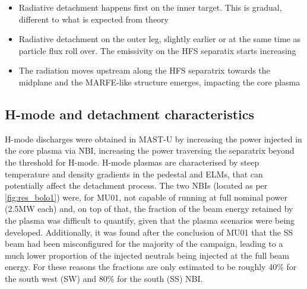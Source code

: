 \begin{itemize}
    \item Radiative detachment happens first on the inner target. This is gradual, different to what is expected from theory\cite{Lipschultz2016}
    \item Radiative detachment on the outer leg, slightly earlier or at the same time as particle flux roll over. The emissivity on the HFS separatix starts increasing
    \item The radiation moves upstream along the HFS separatrix towards the midplane and the MARFE-like structure emerges, impacting the core plasma
\end{itemize}

\subsection{H-mode and detachment characteristics}

H-mode discharges were obtained in MAST-U by increasing the power injected in the core plasma via NBI, increasing the power traversing the separatrix beyond the threshold for H-mode. H-mode plasmas are characterised by steep temperature and density gradients in the pedestal and ELMs, that can potentially affect the detachment process.
The two NBIs (located as per \autoref{fig:res_bolo1}) were, for MU01, not capable of running at full nominal power (2.5MW each) and, on top of that, the fraction of the beam energy retained by the plasma was difficult to quantify, given that the plasma scenarios were being developed. Additionally, it was found after the conclusion of MU01 that the SS beam had been misconfigured for the majority of the campaign, leading to a much lower proportion of the injected neutrals being injected at the full beam energy. For these reasons the fractions are only estimated to be roughly 40\% for the south west (SW) and 80\% for the south (SS) NBI.


